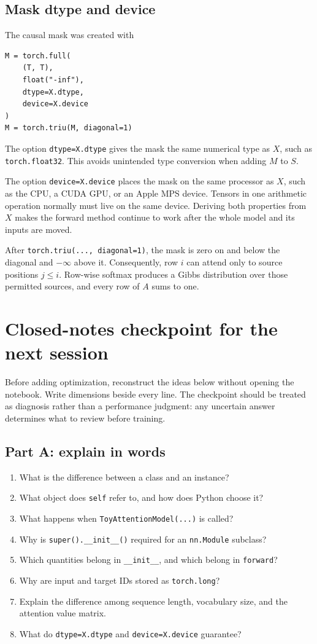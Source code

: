 \documentclass[11pt]{article}
\begin{document}
\subsection{Mask dtype and device}

The causal mask was created with
\begin{lstlisting}
M = torch.full(
    (T, T),
    float("-inf"),
    dtype=X.dtype,
    device=X.device
)
M = torch.triu(M, diagonal=1)
\end{lstlisting}
The option \texttt{dtype=X.dtype} gives the mask the same numerical type as $X$, such as
\texttt{torch.float32}. This avoids unintended type conversion when adding $M$ to $S$.

The option \texttt{device=X.device} places the mask on the same processor as $X$, such as the CPU, a CUDA GPU,
or an Apple MPS device. Tensors in one arithmetic operation normally must live on the same device. Deriving both
properties from $X$ makes the forward method continue to work after the whole model and its inputs are moved.

After \texttt{torch.triu(..., diagonal=1)}, the mask is zero on and below the diagonal and $-\infty$ above it.
Consequently, row $i$ can attend only to source positions $j\le i$. Row-wise softmax produces a Gibbs
distribution over those permitted sources, and every row of $A$ sums to one.

\section{Closed-notes checkpoint for the next session}

Before adding optimization, reconstruct the ideas below without opening the notebook. Write dimensions beside
every line. The checkpoint should be treated as diagnosis rather than a performance judgment: any uncertain
answer determines what to review before training.

\subsection*{Part A: explain in words}
\begin{enumerate}
  \item What is the difference between a class and an instance?
  \item What object does \texttt{self} refer to, and how does Python choose it?
  \item What happens when \texttt{ToyAttentionModel(...)} is called?
  \item Why is \texttt{super().\_\_init\_\_()} required for an \texttt{nn.Module} subclass?
  \item Which quantities belong in \texttt{\_\_init\_\_}, and which belong in \texttt{forward}?
  \item Why are input and target IDs stored as \texttt{torch.long}?
  \item Explain the difference among sequence length, vocabulary size, and the attention value matrix.
  \item What do \texttt{dtype=X.dtype} and \texttt{device=X.device} guarantee?
\end{enumerate}
\end{document}

